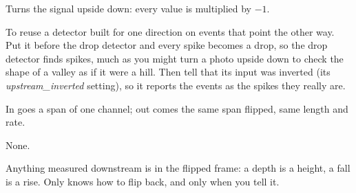 Turns the signal upside down: every value is multiplied by $-1$.

To reuse a detector built for one direction on events that point the other way. Put it before
the drop detector and every spike becomes a drop, so the drop detector finds spikes, much as
you might turn a photo upside down to check the shape of a valley as if it were a hill. Then
tell  that its input was inverted (its
\emph{upstream\_inverted} setting), so it reports the events as the spikes they really are.

In goes a span of one channel; out comes the same span flipped, same length and rate.

None.

Anything measured downstream is in the flipped frame: a depth is a height, a fall is a rise.
Only  knows how to flip back, and only when you tell it.
